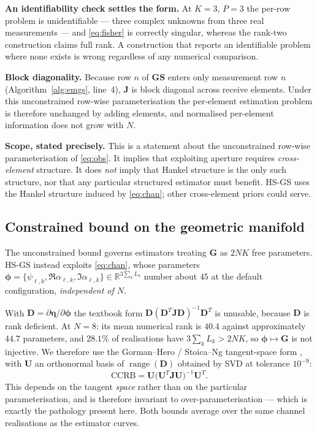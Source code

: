 \documentclass[journal]{IEEEtran}
\DeclareMathOperator{\range}{range}
\newcommand{\bG}{\mathbf{G}}
\newcommand{\bS}{\mathbf{S}}
\newcommand{\bJ}{\mathbf{J}}
\newcommand{\bD}{\mathbf{D}}
\newcommand{\bU}{\mathbf{U}}
\begin{document}
\textbf{An identifiability check settles the form.} At $K=3$, $P=3$ the
per-row problem is unidentifiable --- three complex unknowns from three real
measurements --- and \eqref{eq:fisher} is correctly singular, whereas the
rank-two construction claims full rank. A construction that reports an
identifiable problem where none exists is wrong regardless of any numerical
comparison.

\textbf{Block diagonality.} Because row $n$ of $\bG\bS$ enters only measurement
row $n$ (Algorithm~\ref{alg:emgs}, line~4), $\bJ$ is block diagonal across
receive elements. Under this unconstrained row-wise parameterisation the
per-element estimation problem is therefore unchanged by adding elements, and
normalised per-element information does not grow with $N$.

\textbf{Scope, stated precisely.} This is a statement about the unconstrained
row-wise parameterisation of \eqref{eq:obs}. It implies that exploiting
aperture requires \emph{cross-element} structure. It does \emph{not} imply that
Hankel structure is the only such structure, nor that any particular structured
estimator must benefit. HS-GS uses the Hankel structure induced by
\eqref{eq:chan}; other cross-element priors could serve.

\subsection{Constrained bound on the geometric manifold}

The unconstrained bound governs estimators treating $\bG$ as $2NK$ free
parameters. HS-GS instead exploits \eqref{eq:chan}, whose parameters
$\boldsymbol{\phi}=\{\psi_{\ell,k},\Re\alpha_{\ell,k},\Im\alpha_{\ell,k}\}
\in\mathbb{R}^{3\sum_k L_k}$ number about $45$ at the default configuration,
\emph{independent of $N$}.

With $\bD=\partial\boldsymbol{\eta}/\partial\boldsymbol{\phi}$ the textbook
form $\bD(\bD^{T}\bJ\bD)^{-1}\bD^{T}$ is unusable, because $\bD$ is rank
deficient. At $N=8$:
its mean numerical rank is $40.4$ against
approximately $44.7$ parameters, and
$28.1\%$ of realisations have $3\sum_k L_k>2NK$, so
$\boldsymbol{\phi}\mapsto\bG$ is not injective. We therefore use the
Gorman--Hero / Stoica--Ng tangent-space form
\cite{gorman1990,stoica1998}, with $\bU$ an orthonormal basis of $\range(\bD)$
obtained by SVD at tolerance $10^{-9}$:
\begin{equation}\label{eq:ccrb}
\mathrm{CCRB}=\bU\bigl(\bU^{T}\bJ\bU\bigr)^{-1}\bU^{T}.
\end{equation}
This depends on the tangent \emph{space} rather than on the particular
parameterisation, and is therefore invariant to over-parameterisation ---
which is exactly the pathology present here. Both bounds average over the same
channel realisations as the estimator curves.
\end{document}

